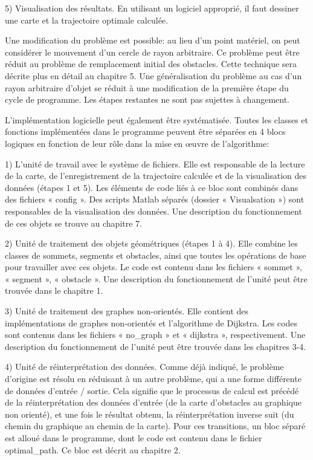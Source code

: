 \documentclass[12pt]{article}
\begin{document}
	5) Visualisation des résultats. En utilisant un logiciel approprié, il faut dessiner une carte et la trajectoire optimale calculée.
	
	Une modification du problème est possible: au lieu d'un point matériel, on peut considérer le mouvement d'un cercle de rayon arbitraire. Ce problème peut être réduit au problème de remplacement initial des obstacles. Cette technique sera décrite plus en détail au chapitre 5. Une généralisation du problème au cas d'un rayon arbitraire d’objet se réduit à une modification de la première étape du cycle de programme. Les étapes restantes ne sont pas sujettes à changement.
	
	L'implémentation logicielle peut également être systématisée. Toutes les classes et fonctions implémentées dans le programme peuvent être séparées en 4 blocs logiques en fonction de leur rôle dans la mise en œuvre de l'algorithme:
	
	1) L'unité de travail avec le système de fichiers. Elle est responsable de la lecture de la carte, de l'enregistrement de la trajectoire calculée et de la visualisation des données (étapes 1 et 5). Les éléments de code liés à ce bloc sont combinés dans des fichiers « config ». Des scripts Matlab séparés (dossier « Visualsation ») sont responsables de la visualisation des données. Une description du fonctionnement de ces objets se trouve au chapitre 7.
	
	2) Unité de traitement des objets géométriques (étapes 1 à 4). Elle combine les classes de sommets, segments et obstacles, ainsi que toutes les opérations de base pour travailler avec ces objets. Le code est contenu dans les fichiers  « sommet », « segment », « obstacle ». Une description du fonctionnement de l'unité peut être trouvée dans le chapitre 1.
	
	3) Unité de traitement des graphes non-orientés. Elle contient des implémentations de graphes non-orientés et l'algorithme de Dijkstra. Les codes sont contenus dans les fichiers « no\_graph » et « dijkstra », respectivement. Une description du fonctionnement de l'unité peut être trouvée dans les chapitres 3-4.
	
	4) Unité de réinterprétation des données. Comme déjà indiqué, le problème d'origine est résolu en réduisant à un autre problème, qui a une forme différente de données d'entrée / sortie. Cela signifie que le processus de calcul est précédé de la réinterprétation des données d'entrée (de la carte d'obstacles au graphique non orienté), et une fois le résultat obtenu, la réinterprétation inverse suit (du chemin du graphique au chemin de la carte). Pour ces transitions, un bloc séparé est alloué dans le programme, dont le code est contenu dans le fichier optimal\_path. Ce bloc est décrit au chapitre 2.
	
\end{document}

